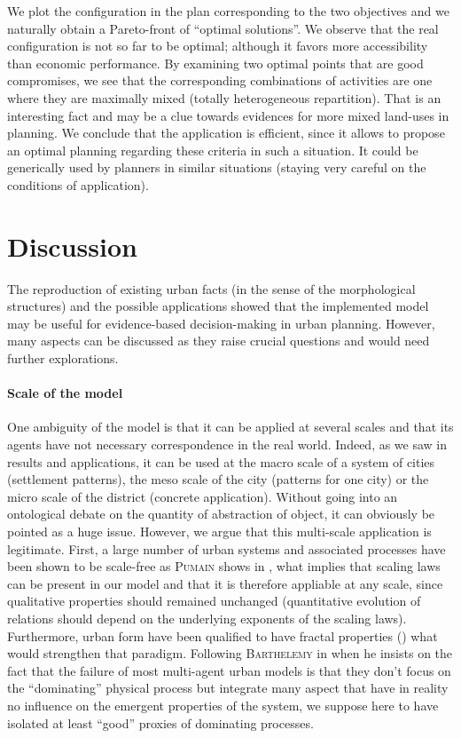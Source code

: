 \documentclass[a4paper,twocolumn,twoside,10pt]{article}
\newcommand{\noun}[1]{\textsc{#1}}
\begin{document}
We plot the configuration in the plan corresponding to the two objectives
and we naturally obtain a Pareto-front of ``optimal solutions''.
We observe that the real configuration is not so far to be optimal;
although it favors more accessibility than economic performance.
By examining two optimal points that are good compromises, we see
that the corresponding combinations of activities are one where they
are maximally mixed (totally heterogeneous repartition). That is an
interesting fact and may be a clue towards evidences for more mixed
land-uses in planning. We conclude that the application is efficient,
since it allows to propose an optimal planning regarding these criteria
in such a situation. It could be generically used by planners in similar
situations (staying very careful on the conditions of application).


\section{Discussion}

The reproduction of existing urban facts (in the sense of the morphological
structures) and the possible applications showed that the implemented
model may be useful for evidence-based decision-making in urban planning.
However, many aspects can be discussed as they raise crucial questions
and would need further explorations.




\paragraph{Scale of the model}

One ambiguity of the model is that it can be applied at several scales
and that its agents have not necessary correspondence in the real
world. Indeed, as we saw in results and applications, it can be used
at the macro scale of a system of cities (settlement patterns), the
meso scale of the city (patterns for one city) or the micro scale
of the district (concrete application). Without going into an ontological
debate on the quantity of abstraction of object, it can obviously
be pointed as a huge issue. However, we argue that this multi-scale
application is legitimate. First, a large number of urban systems
and associated processes have been shown to be scale-free as \noun{Pumain}
shows in \cite{pumain2004scaling}, what implies that scaling laws
can be present in our model and that it is therefore appliable at
any scale, since qualitative properties should remained unchanged
(quantitative evolution of relations should depend on the underlying
exponents of the scaling laws). Furthermore, urban form have been qualified to have fractal
properties (\cite{FractalCities}) what would strengthen that paradigm.
Following \noun{Barthelemy} in \cite{2013arXiv1309.3961L} when he
insists on the fact that the failure of most multi-agent urban models
is that they don't focus on the ``dominating'' physical process but
integrate many aspect that have in reality no influence on the emergent
properties of the system, we suppose here to have isolated at least
``good'' proxies of dominating processes.
\end{document}
